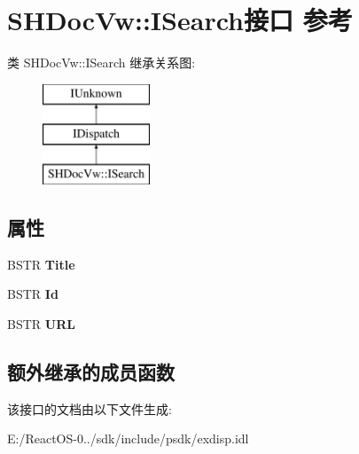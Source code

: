 \hypertarget{interface_s_h_doc_vw_1_1_i_search}{}\section{S\+H\+Doc\+Vw\+:\+:I\+Search接口 参考}
\label{interface_s_h_doc_vw_1_1_i_search}
类 S\+H\+Doc\+Vw\+:\+:I\+Search 继承关系图\+:\begin{figure}[H]
\begin{center}
\leavevmode
\includegraphics[height=3.000000cm]{interface_s_h_doc_vw_1_1_i_search}
\end{center}
\end{figure}
\subsection*{属性}
\begin{DoxyCompactItemize}
\item 
\mbox{\label{interface_s_h_doc_vw_1_1_i_search_a91f21b83bc849fd34034cb0b34271f23}} 
B\+S\+TR {\bfseries Title}
\item 
\mbox{\label{interface_s_h_doc_vw_1_1_i_search_ad7dadcfbb9d2696f6346888fdf51652d}} 
B\+S\+TR {\bfseries Id}
\item 
\mbox{\label{interface_s_h_doc_vw_1_1_i_search_af045aebbb126d80ae49c7fd0a328fcb2}} 
B\+S\+TR {\bfseries U\+RL}
\end{DoxyCompactItemize}
\subsection*{额外继承的成员函数}


该接口的文档由以下文件生成\+:\begin{DoxyCompactItemize}
\item 
E\+:/\+React\+O\+S-\/0../sdk/include/psdk/exdisp.\+idl\end{DoxyCompactItemize}
